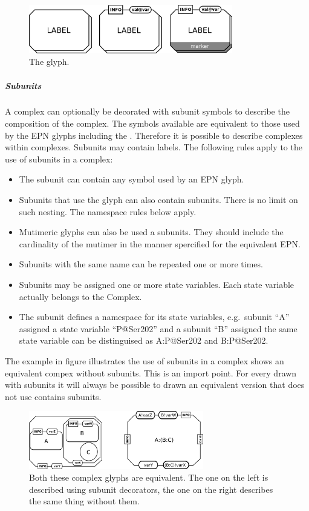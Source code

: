 \begin{figure}[H]
  \centering
  \includegraphics[width = 3.5in]{images/complexMultimerGlyph}
  \caption{The  glyph.}
  \label{fig:complexMultimer}
\end{figure}

\subparagraph{Subunits}

A complex can optionally be decorated with subunit symbols to describe
the composition of the complex. The symbols available are equivalent
to those used by the EPN glyphs including the
. Therefore it is possible to describe complexes within
complexes. Subunits may contain labels. The following rules apply to
the use of subunits in a complex:

\begin{itemize}
\item The subunit can contain any symbol used by an EPN glyph.
\item Subunits that use the  glyph can also contain
  subunits. There is no limit on such nesting. The namespace rules
  below apply.
\item Mutimeric glyphs can also be used a subunits. They should
  include the cardinality of the mutimer in the manner spercified for
  the equivalent EPN.
\item Subunits with the same name can be repeated one or more times.
\item Subunits may be assigned one or more state variables. Each state
  variable actually belongs to the Complex.
\item The subunit defines a namespace for its state variables, e.g.\,
  subunit ``A'' assigned a state variable ``P@Ser202''  and a subunit
  ``B'' assigned the same state variable can be distinguised as
  A:P@Ser202 and B:P@Ser202.
\end{itemize}

The example in figure  illustrates the use of
subunits in a complex shows an equivalent compex without
subunits. This is an import point. For every  drawn
with subunits it will always be possible to drawn an equivalent
version that does not use contains subunits.

\begin{figure}[H]
  \centering
  \includegraphics[width = 3.0in]{images/complex}
  \caption{Both these complex glyphs are equivalent. The one on the
    left is described using subunit decorators, the one on the right
    describes the same thing without them.}
  \label{fig:complexMultimer}
\end{figure}

